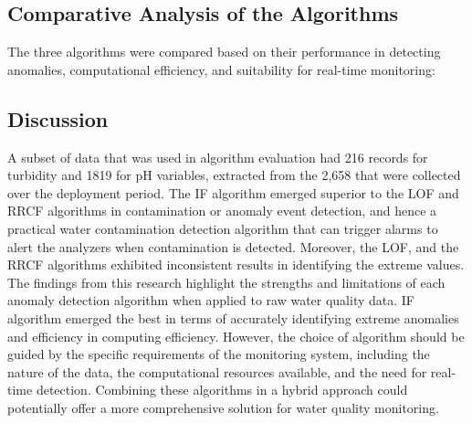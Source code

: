 \documentclass[12pt]{report}
\begin{document}
\subsection{Comparative Analysis of the Algorithms}
The three algorithms were compared based on their performance in detecting anomalies, computational efficiency, and suitability for real-time monitoring: \\
\begin{table}[h!]
\centering
\caption{Performance of Anomaly Detection Algorithms}
\label{tab:algorithm_performance}
\end{table}



\clearpage
\subsection{Discussion}
A subset of data that was used in algorithm evaluation had 216 records for turbidity and  1819 for pH variables, extracted from the 2,658 that were collected over the
deployment period. The IF algorithm emerged superior to
the LOF and RRCF algorithms in contamination or
anomaly event detection, and hence a practical water
contamination detection algorithm that can trigger alarms to
alert the analyzers when contamination is detected. Moreover, the LOF, and the RRCF algorithms exhibited inconsistent results in   identifying  the extreme values.
The findings from this research highlight the strengths and limitations of each anomaly detection algorithm when applied to raw water quality data. IF algorithm  emerged  the best  in terms  of accurately  identifying  extreme  anomalies  and  efficiency in computing  efficiency.   
However, the choice of algorithm should be guided by the specific requirements of the monitoring system, including the nature of the data, the computational resources available, and the need for real-time detection. Combining these algorithms in a hybrid approach could potentially offer a more comprehensive solution for water quality monitoring.
\clearpage
\end{document}
